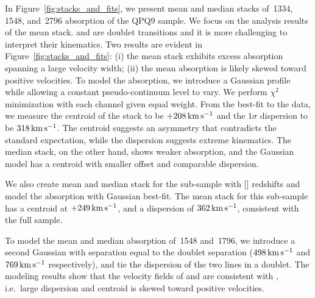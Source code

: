 \documentclass[iop]{emulateapj}
\begin{document}
In Figure~\ref{fig:stacks_and_fits}, we present mean and median stacks of \,1334, 
\,1548, and \,2796 absorption of the QPQ9 sample. We focus on the 
analysis results of the  mean stack.  and  are doublet transitions 
and it is more challenging to interpret their kinematics.
Two results are evident in Figure~\ref{fig:stacks_and_fits}: (i) the mean  stack 
exhibits excess absorption spanning a large velocity width; (ii) the mean absorption is likely 
skewed toward positive velocities. To model the absorption, we introduce a Gaussian profile while 
allowing a constant pseudo-continuum level to vary. We perform $\chi^2$ minimization with each 
channel given equal weight. From the best-fit to the data, we measure the centroid of the 
 stack to be $+208\,{\rm km\,s^{-1}}$ and the $1\sigma$ dispersion to be 
$318\,{\rm km\,s^{-1}}$. The centroid suggests an asymmetry that contradicts the standard 
expectation, while the dispersion suggests extreme kinematics. The median stack, on the other 
hand, shows weaker absorption, and the Gaussian model has a centroid with smaller offset and 
comparable dispersion. 

We also create mean and median stack for the sub-sample with [] redshifts and model the 
absorption with Gaussian best-fit. The  mean stack for this sub-sample has a centroid at 
$+249\,{\rm km\,s^{-1}}$, and a dispersion of $362\,{\rm km\,s^{-1}}$, consistent with the full 
sample. 

To model the mean and median absorption of \,1548 and \,1796, we introduce a  
second Gaussian with separation equal to the doublet separation ($498\,{\rm km\,s^{-1}}$ and 
$769\,{\rm km\,s^{-1}}$ respectively), and tie the dispersion of the two lines in a doublet. The 
modeling results show that the velocity fields of  and  are consistent with 
, i.e.\ large dispersion and centroid is skewed toward positive velocities. 
\end{document}
